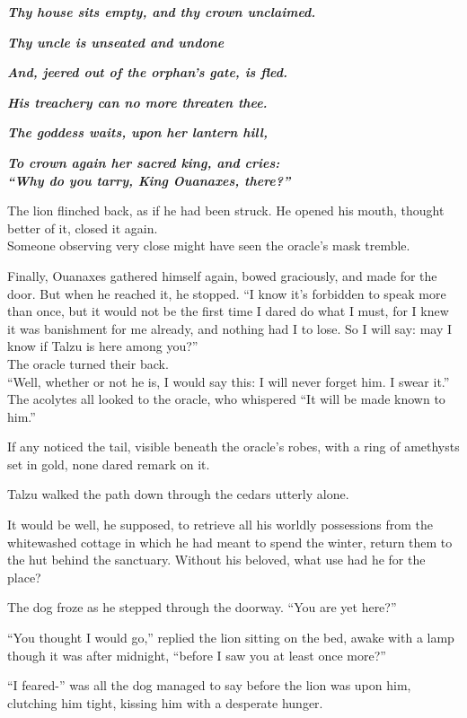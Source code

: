 \emph{\textbf{Thy house sits empty, and thy crown unclaimed.}}

\emph{\textbf{Thy uncle is unseated and undone}}

\emph{\textbf{And, jeered out of the orphan's gate, is fled.}}

\emph{\textbf{His treachery can no more threaten thee.}}

\emph{\textbf{The goddess waits, upon her lantern hill,}}

\emph{\textbf{To crown again her sacred king, and cries:\\
``Why do you tarry, King Ouanaxes, there?''}}

The lion flinched back, as if he had been struck. He opened his mouth, thought better of it, closed it again.\\
Someone observing very close might have seen the oracle's mask tremble.

Finally, Ouanaxes gathered himself again, bowed graciously, and made for the door. But when he reached it, he stopped. ``I know it's forbidden to speak more than once, but it would not be the first time I dared do what I must, for I knew it was banishment for me already, and nothing had I to lose. So I will say: may I know if Talzu is here among you?''\\
The oracle turned their back.\\
``Well, whether or not he is, I would say this: I will never forget him. I swear it.''\\
The acolytes all looked to the oracle, who whispered ``It will be made known to him.''

If any noticed the tail, visible beneath the oracle's robes, with a ring of amethysts set in gold, none dared remark on it.

Talzu walked the path down through the cedars utterly alone.

It would be well, he supposed, to retrieve all his worldly possessions from the whitewashed cottage in which he had meant to spend the winter, return them to the hut behind the sanctuary. Without his beloved, what use had he for the place?

The dog froze as he stepped through the doorway. ``You are yet here?''

``You thought I would go,'' replied the lion sitting on the bed, awake with a lamp though it was after midnight, ``before I saw you at least once more?''

``I feared-'' was all the dog managed to say before the lion was upon him, clutching him tight, kissing him with a desperate hunger.

